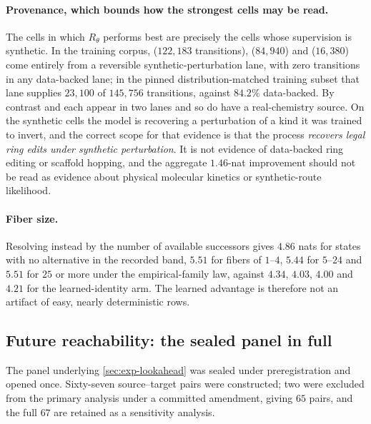 \paragraph{Provenance, which bounds how the strongest cells may be read.}
The cells in which $R_\theta$ performs best are precisely the cells whose supervision is synthetic. In the training corpus,  ($122{,}183$ transitions),  ($84{,}940$) and  ($16{,}380$) come entirely from a reversible synthetic-perturbation lane, with zero transitions in any data-backed lane; in the pinned distribution-matched training subset that lane supplies $23{,}100$ of $145{,}756$ transitions, against $84.2\%$ data-backed. By contrast  and  each appear in two lanes and so do have a real-chemistry source. On the synthetic cells the model is recovering a perturbation of a kind it was trained to invert, and the correct scope for that evidence is that the process \emph{recovers legal ring edits under synthetic perturbation}. It is not evidence of data-backed ring editing or scaffold hopping, and the aggregate $1.46$-nat improvement should not be read as evidence about physical molecular kinetics or synthetic-route likelihood.

\paragraph{Fiber size.}
Resolving instead by the number of available successors gives $4.86$ nats for states with no alternative in the recorded band, $5.51$ for fibers of $1$--$4$, $5.44$ for $5$--$24$ and $5.51$ for $25$ or more under the empirical-family law, against $4.34$, $4.03$, $4.00$ and $4.21$ for the learned-identity arm. The learned advantage is therefore not an artifact of easy, nearly deterministic rows.

\subsection{Future reachability: the sealed panel in full}
\label{app:ext-lookahead}

The panel underlying \cref{sec:exp-lookahead} was sealed under preregistration and opened once. Sixty-seven source--target pairs were constructed; two were excluded from the primary analysis under a committed amendment, giving $65$ pairs, and the full $67$ are retained as a sensitivity analysis.

